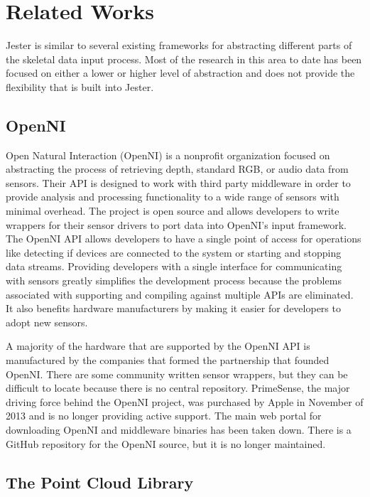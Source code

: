 \chapter{Related Works}

Jester is similar to several existing frameworks for abstracting different parts of the skeletal data input process. Most of the research in this area to date has been focused on either a lower or higher level of abstraction and does not provide the flexibility that is built into Jester.

\section{OpenNI}

Open Natural Interaction (OpenNI) is a nonprofit organization focused on abstracting the process of retrieving depth, standard RGB, or audio data from sensors. Their API is designed to work with third party middleware in order to provide analysis and processing functionality to a wide range of sensors with minimal overhead. The project is open source and allows developers to write wrappers for their sensor drivers to port data into OpenNI’s input framework. The OpenNI API allows developers to have a single point of access for operations like detecting if devices are connected to the system or starting and stopping data streams. Providing developers with a single interface for communicating with sensors greatly simplifies the development process because the problems associated with supporting and compiling against multiple APIs are eliminated. It also benefits hardware manufacturers by making it easier for developers to adopt new sensors.

A majority of the hardware that are supported by the OpenNI API is manufactured by the companies that formed the partnership that founded OpenNI. There are some community written sensor wrappers, but they can be difficult to locate because there is no central repository. PrimeSense, the major driving force behind the OpenNI project, was purchased by Apple in November of 2013 and is no longer providing active support. The main web portal for downloading OpenNI and middleware binaries has been taken down. There is a GitHub repository for the OpenNI source, but it is no longer maintained.

\section{The Point Cloud Library}

